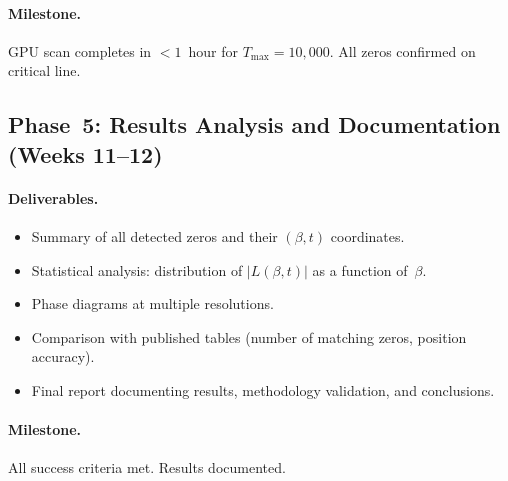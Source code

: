 \paragraph{Milestone.}
GPU scan completes in $< 1$~hour for $T_{\max} = 10{,}000$. All zeros confirmed on
critical line.


\subsection*{Phase~5: Results Analysis and Documentation (Weeks 11--12)}

\paragraph{Deliverables.}
\begin{itemize}
  \item Summary of all detected zeros and their $(\beta, t)$ coordinates.
  \item Statistical analysis: distribution of $|L(\beta, t)|$ as a function of~$\beta$.
  \item Phase diagrams at multiple resolutions.
  \item Comparison with published tables (number of matching zeros, position accuracy).
  \item Final report documenting results, methodology validation, and conclusions.
\end{itemize}

\paragraph{Milestone.}
All success criteria met. Results documented.
